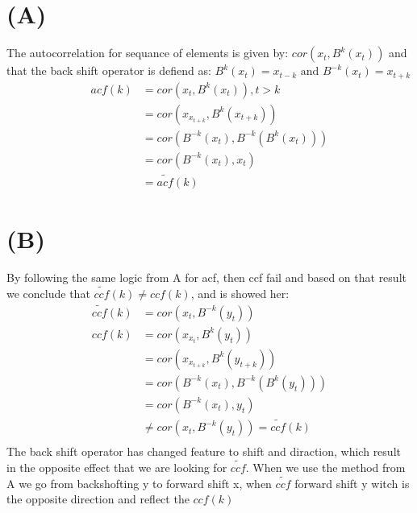 \documentclass[a4paper]{article}
\begin{document}
\section*{(A)}
The autocorrelation for sequance of elements is given by: $cor(x_t, B^k (x_t))$ 
and that the back shift operator is defiend as: $ B^{k}(x_t) = x_{t-k} \text{ and } B^{-k}(x_t) = x_{t+k} $
\begin{align*}
    acf(k) &= cor(x_t, B^k (x_t)), t > k \\
    &= cor(x_{x_{t + k}}, B^k(x_{t + k})) \\
    &= cor( B^{-k}(x_{t}), B^{-k}(B^k( x_t )) ) \\
    &= cor(B^{-k}(x_t), x_t) \\
    &= \tilde{acf}(k)
\end{align*}


\section*{(B)}
By following the same logic from A for acf, then ccf fail and based on 
that result we conclude that $\tilde{ccf}(k) \neq ccf(k)$, and is showed her:
\begin{align*}
    \tilde{ccf}(k) &= cor(x_t, B^{-k}(y_t)) \\
    ccf(k) &= cor(x_{x_{t}}, B^k(y_{t})) \\
    &= cor(x_{x_{t + k}}, B^k(y_{t + k})) \\
    &= cor( B^{-k}(x_{t}), B^{-k}(B^k( y_t )) ) \\
    &= cor(B^{-k}(x_t), y_t) \\
    & \neq  cor(x_t, B^{-k}(y_t)) = \tilde{ccf}(k)\\
\end{align*}
The back shift operator has changed feature to shift and diraction, which result 
in the opposite effect that we are looking for $\tilde{ccf}$. When we use the method from A 
we go from backshofting y to forward shift x, when $\tilde{ccf}$ forward shift y witch is 
the opposite direction and reflect the $ccf(k)$
\end{document}
